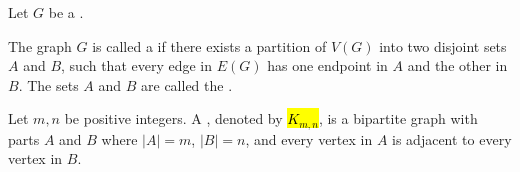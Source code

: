 \begin{definition} \label{definition:bipartite_graph_complete_bipartite_graph}
Let $G$ be a .

The graph $G$ is called a  if there exists a partition of $V(G)$ into two disjoint sets $A$ and $B$, such that every edge in $E(G)$ has one endpoint in $A$ and the other in $B$. The sets $A$ and $B$ are called the .

Let $m, n$ be positive integers. A , denoted by \hl{$K_{m,n}$}, is a bipartite graph with parts $A$ and $B$ where $|A| = m$, $|B| = n$, and every vertex in $A$ is adjacent to every vertex in $B$.
\end{definition}
